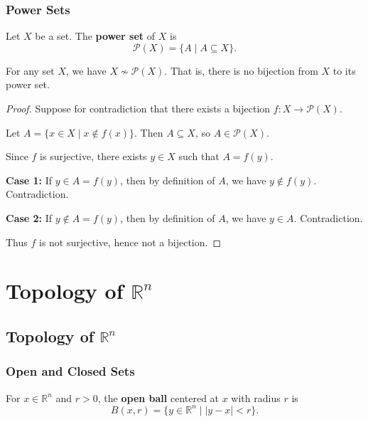 \documentclass[11pt]{report}
\begin{document}
\subsection{Power Sets}

\begin{defbox}
Let $X$ be a set. The \textbf{power set} of $X$ is
\[
\mathcal{P}(X) = \{A \mid A \subseteq X\}.
\]
\end{defbox}

\begin{thmbox}
For any set $X$, we have $X \not\sim \mathcal{P}(X)$. That is, there is no bijection from $X$ to its power set.
\end{thmbox}

\begin{proof}
Suppose for contradiction that there exists a bijection $f: X \to \mathcal{P}(X)$.

Let $A = \{x \in X \mid x \notin f(x)\}$. Then $A \subseteq X$, so $A \in \mathcal{P}(X)$.

Since $f$ is surjective, there exists $y \in X$ such that $A = f(y)$.

\textbf{Case 1:} If $y \in A = f(y)$, then by definition of $A$, we have $y \notin f(y)$. Contradiction.

\textbf{Case 2:} If $y \notin A = f(y)$, then by definition of $A$, we have $y \in A$. Contradiction.

Thus $f$ is not surjective, hence not a bijection.
\end{proof}


\chapter{Topology of $\mathbb{R}^n$}

\section{Topology of $\mathbb{R}^n$}

\subsection{Open and Closed Sets}

\begin{defbox}
For $x \in \mathbb{R}^n$ and $r > 0$, the \textbf{open ball} centered at $x$ with radius $r$ is
\[
B(x, r) = \{y \in \mathbb{R}^n \mid |y - x| < r\}.
\]
\end{defbox}
\end{document}
